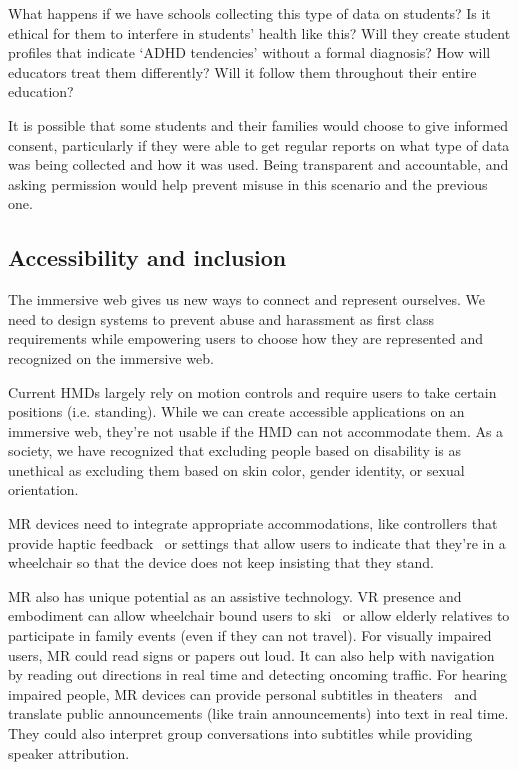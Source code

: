 What happens if we have schools collecting this type of data on students? Is it ethical for them to interfere in students' health like this? Will they create student profiles that indicate `ADHD tendencies' without a formal diagnosis? How will educators treat them differently? Will it follow them throughout their entire education?

It is possible that some students and their families would choose to give informed consent, particularly if they were able to get regular reports on what type of data was being collected and how it was used. Being transparent and accountable, and asking permission would help prevent misuse in this scenario and the previous one.


\subsection{Accessibility and inclusion}

The immersive web gives us new ways to connect and represent ourselves. We need to design systems to prevent abuse and harassment as first class requirements while empowering users to choose how they are represented and recognized on the immersive web.

Current HMDs largely rely on motion controls and require users to take certain positions (i.e. standing). While we can create accessible applications on an immersive web, they're not usable if the HMD can not accommodate them. As a society, we have recognized that excluding people based on disability is as unethical as excluding them based on skin color, gender identity, or sexual orientation.

MR devices need to integrate appropriate accommodations, like controllers that provide haptic feedback~\cite{zhao2018demonstration} or settings that allow users to indicate that they're in a wheelchair so that the device does not keep insisting that they stand.

MR also has unique potential as an assistive technology. VR presence and embodiment can allow wheelchair bound users to ski~\cite{harrell} or allow elderly relatives to participate in family events (even if they can not travel). For visually impaired users, MR could read signs or papers out loud. It can also help with navigation by reading out directions in real time and detecting oncoming traffic. For hearing impaired people, MR devices can provide personal subtitles in theaters~\cite{forrest} and translate public announcements (like train announcements) into text in real time. They could also interpret group conversations into subtitles while providing speaker attribution.

